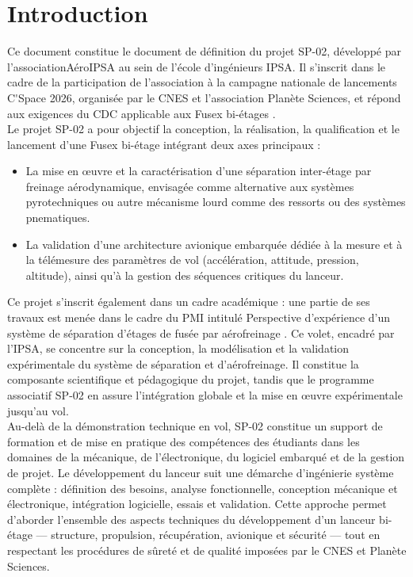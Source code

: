 \section*{Introduction}
\label{sec:introduction}

Ce document constitue le document de définition du projet SP-02, développé par l'association\newline AéroIPSA au sein de l'école
d'ingénieurs \acrshort{IPSA}. Il s'inscrit dans le cadre de la participation de l'association à la campagne nationale de
lancements \gls{C'Space} 2026, organisée par le \acrfull{CNES} et l'association \gls{Planète Sciences}, et répond aux exigences
du \acrfull{CDC} applicable aux \gls{Fusex} bi-étages \cite{CDC_BiEtage}.\\

Le projet SP-02 a pour objectif la conception, la réalisation, la qualification et le lancement d'une \gls{Fusex} bi-étage
intégrant deux axes principaux :
\begin{itemize}
    \item La mise en œuvre et la caractérisation d'une séparation inter-étage par freinage aérodynamique, envisagée comme
    alternative aux systèmes pyrotechniques ou autre mécanisme lourd comme des ressorts ou des systèmes pnematiques.
    \item La validation d'une architecture avionique embarquée dédiée à la mesure et à la télémesure des paramètres de vol
    (accélération, attitude, pression, altitude), ainsi qu'à la gestion des séquences critiques du lanceur.\\
\end{itemize}

Ce projet s'inscrit également dans un cadre académique : une partie de ses travaux est menée dans le cadre du \acrfull{PMI}
intitulé \og{}Perspective d'expérience d'un système de séparation d'étages de fusée par aérofreinage \fg{}. Ce volet, encadré par
l'\acrshort{IPSA}, se concentre sur la conception, la modélisation et la validation expérimentale du système de séparation et
d'aérofreinage. Il constitue la composante scientifique et pédagogique du projet, tandis que le programme associatif SP-02 en
assure l'intégration globale et la mise en œuvre expérimentale jusqu'au vol.\\

Au-delà de la démonstration technique en vol, SP-02 constitue un support de formation et de mise en pratique des compétences des
étudiants dans les domaines de la mécanique, de l'électronique, du logiciel embarqué et de la gestion de projet. Le développement
du lanceur suit une démarche d'ingénierie système complète : définition des besoins, analyse fonctionnelle, conception mécanique
et électronique, intégration logicielle, essais et validation. Cette approche permet d'aborder l'ensemble des aspects techniques
du développement d'un lanceur bi-étage — structure, propulsion, récupération, avionique et sécurité — tout en respectant les
procédures de sûreté et de qualité imposées par le \acrshort{CNES} et \gls{Planète Sciences}.\\

